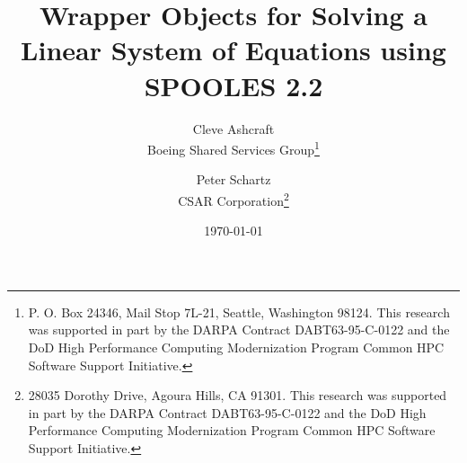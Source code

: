 \documentclass[10pt]{report}
\begin{document}
 


\title{Wrapper Objects for Solving \break
       a Linear System of Equations\break
       using {\bf SPOOLES} 2.2}
 
\author{
Cleve Ashcraft\\
Boeing Shared Services Group\thanks{
  P. O. Box 24346,
  Mail Stop 7L-21,
  Seattle, Washington 98124.
  This research was supported in part by the DARPA
  Contract DABT63-95-C-0122 and the DoD High Performance Computing
  Modernization Program Common HPC Software Support Initiative.}
\and
Peter Schartz \\
CSAR Corporation\thanks{
  28035 Dorothy Drive, Agoura Hills, CA 91301.
  This research was supported in part by the DARPA
  Contract DABT63-95-C-0122 and the DoD High Performance Computing
  Modernization Program Common HPC Software Support Initiative.}
}
 
\date{\today}
\maketitle
 


\tableofcontents

  
  
  
  
  

  \appendix
  
  
  


\end{document}
